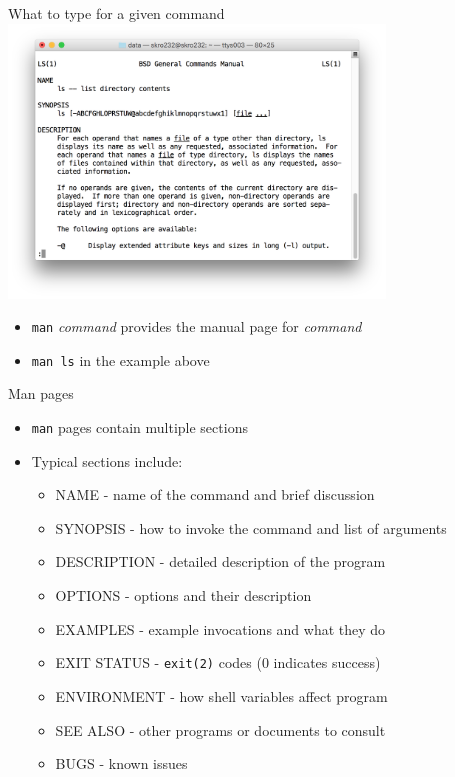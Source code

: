 \documentclass[t]{beamer}
\begin{document}
\begin{frame}{What to type for a given command}
  \includegraphics[width=10cm,scale=0.4]{images/manls.png}
  \begin{itemize}
  \item \texttt{man} \textit{command}  provides the manual page for \textit{command}
  \item  \texttt{man ls} in the example above
  \end{itemize}
  \note{}
\end{frame}

\begin{frame}{Man pages}
  \begin{itemize}
  \item \texttt{man} pages contain multiple sections
  \item Typical sections include:
    \begin{itemize}
    \item NAME - name of the command and brief discussion
    \item SYNOPSIS - how to invoke the command and list of arguments
    \item DESCRIPTION - detailed description of the program
    \item OPTIONS - options and their description
    \item EXAMPLES - example invocations and what they do
    \item EXIT STATUS - \texttt{exit(2)} codes (0 indicates success) 
    \item ENVIRONMENT - how shell variables affect program
    \item SEE ALSO - other programs or documents to consult
    \item BUGS - known issues
    \end{itemize}
  \end{itemize}
  \note{}
\end{frame}
\end{document}
